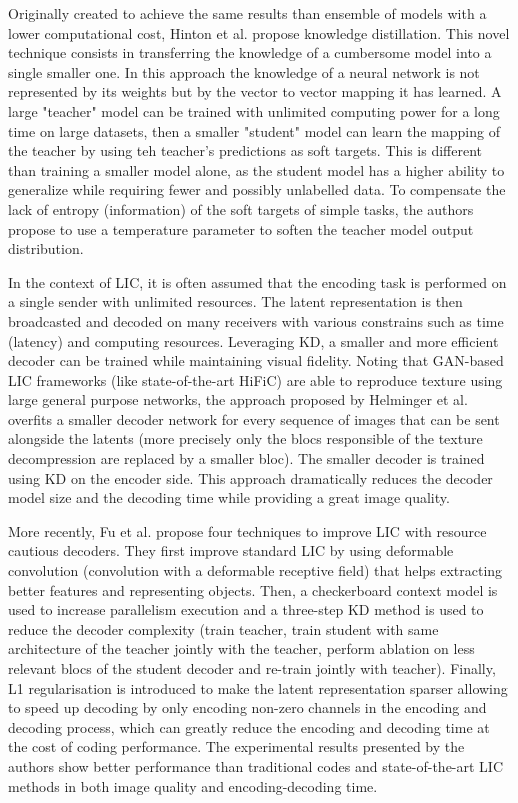 Originally created to achieve the same results than ensemble of models with a lower computational cost, Hinton et al. \cite{hinton2015distillingknowledgeneuralnetwork} propose knowledge distillation. This novel technique consists in transferring the knowledge of a cumbersome model into a single smaller one. In this approach the knowledge of a neural network is not represented by its weights but by the vector to vector mapping it has learned. A large "teacher" model can be trained with unlimited computing power for a long time on large datasets, then a smaller "student" model can learn the mapping of the teacher by using teh teacher's predictions as soft targets. This is different than training a smaller model alone, as the student model has a higher ability to generalize while requiring fewer and possibly unlabelled data. To compensate the lack of entropy (information) of the soft targets of simple tasks, the authors propose to use a temperature parameter to soften the teacher model output distribution.

In the context of LIC, it is often assumed that the encoding task is performed on a single sender with unlimited resources. The latent representation is then broadcasted and decoded on many receivers with various constrains such as time (latency) and computing resources. Leveraging KD, a smaller and more efficient decoder can be trained while maintaining visual fidelity. Noting that GAN-based LIC frameworks (like state-of-the-art HiFiC) are able to reproduce texture using large general purpose networks, the approach proposed by Helminger et al. \cite{helminger2022microdosingknowledgedistillationgan} overfits a smaller decoder network for every sequence of images that can be sent alongside the latents (more precisely only the blocs responsible of the texture decompression are replaced by a smaller bloc). The smaller decoder is trained using KD on the encoder side. This approach dramatically reduces the decoder model size and the decoding time while providing a great image quality.

More recently, Fu et al. \cite{fu2023fasthighperformancelearnedimage} propose four techniques to improve LIC with resource cautious decoders. They first improve standard LIC by using deformable convolution (convolution with a deformable receptive field) that helps extracting better features and representing objects. Then, a checkerboard context model is used to increase parallelism execution and a three-step KD method is used to reduce the decoder complexity (train teacher, train student with same architecture of the teacher jointly with the teacher, perform ablation on less relevant blocs of the student decoder and re-train jointly with teacher). Finally, L1 regularisation is introduced to make the latent representation sparser allowing to speed up decoding by only encoding non-zero channels in the encoding and decoding process, which can greatly reduce the encoding and decoding time at the cost of coding performance. The experimental results presented by the authors show better performance than traditional codes and state-of-the-art LIC methods in both image quality and encoding-decoding time.


